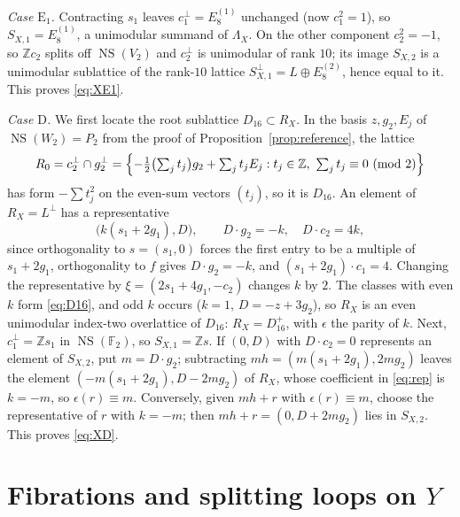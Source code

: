 \documentclass[11pt]{article}
\newcommand{\Z}{\mathbb Z}
\newcommand{\F}{\mathbb F}
\newcommand{\NS}{\operatorname{NS}}
\theoremstyle{definition}
\theoremstyle{remark}
\begin{document}
\emph{Case \(\mathrm E_1\).} Contracting \(s_1\) leaves
\(c_1^\perp=E_8^{(1)}\) unchanged (now \(c_1^2=1\)), so
\(S_{X,1}=E_8^{(1)}\), a unimodular summand of \(\Lambda_X\). On the
other component \(c_2^2=-1\), so \(\Z c_2\) splits off \(\NS(V_2)\) and
\(c_2^\perp\) is unimodular of rank \(10\); its image \(S_{X,2}\) is a
unimodular sublattice of the rank-\(10\) lattice
\(S_{X,1}^\perp=L\oplus E_8^{(2)}\), hence equal to it. This proves
\eqref{eq:XE1}.

\emph{Case \(\mathrm D\).} We first locate the root sublattice
\(D_{16}\subset R_X\). In the basis \(z,g_2,E_j\) of
\(\NS(W_2)=P_2\) from the proof of Proposition~\ref{prop:reference},
the lattice
\begin{equation}\label{eq:D16}
 R_0=c_2^\perp\cap g_2^\perp
 =\Bigl\{-\tfrac12\bigl(\textstyle\sum_jt_j\bigr)g_2+\sum_jt_jE_j:
                     t_j\in\Z,\ \sum_jt_j\equiv0\ (\mathrm{mod}\ 2)\Bigr\}
\end{equation}
has form \(-\sum t_j^2\) on the even-sum vectors \((t_j)\), so it is
\(D_{16}\). An element of \(R_X=L^\perp\) has a representative
\begin{equation}\label{eq:rep}
 \bigl(k(s_1+2g_1),D\bigr),\qquad
 D\cdot g_2=-k,\quad D\cdot c_2=4k ,
\end{equation}
since orthogonality to \(s=(s_1,0)\) forces the first entry to be a
multiple of \(s_1+2g_1\), orthogonality to \(f\) gives
\(D\cdot g_2=-k\), and \((s_1+2g_1)\cdot c_1=4\). Changing the
representative by \(\xi=(2s_1+4g_1,-c_2)\) changes \(k\) by \(2\). The
classes with even \(k\) form \eqref{eq:D16}, and odd \(k\) occurs
(\(k=1\), \(D=-z+3g_2\)), so \(R_X\) is an even unimodular index-two overlattice of \(D_{16}\):
\(R_X=D_{16}^+\), with \(\epsilon\) the parity of \(k\). Next,
\(c_1^\perp=\Z s_1\) in \(\NS(\F_2)\), so \(S_{X,1}=\Z s\). If
\((0,D)\) with \(D\cdot c_2=0\) represents an element of \(S_{X,2}\),
put \(m=D\cdot g_2\); subtracting \(mh=(m(s_1+2g_1),2mg_2)\) leaves the
element \((-m(s_1+2g_1),D-2mg_2)\) of \(R_X\), whose coefficient in
\eqref{eq:rep} is \(k=-m\), so \(\epsilon(r)\equiv m\). Conversely,
given \(mh+r\) with \(\epsilon(r)\equiv m\), choose the representative
of \(r\) with \(k=-m\); then \(mh+r=(0,D+2mg_2)\) lies in \(S_{X,2}\).
This proves \eqref{eq:XD}.

\section{Fibrations and splitting loops on \texorpdfstring{\(Y\)}{Y}}\label{sec:fibrations}
\end{document}
